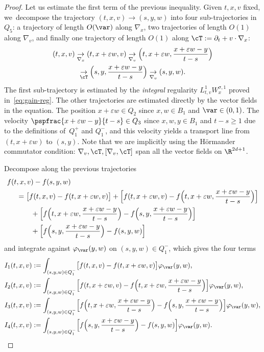 \begin{proof}
Let us estimate the first term of the previous
inequality. Given $t,x,v$ fixed, we~decompose the trajectory
$(t,x,v)\to (s,y,w)$ into four sub-trajectories in
$Q_5$: a trajectory of length $O(\var)$ along $\nabla_x$, two
trajectories of length $O(1)$ along $\nabla_v$, and finally one
trajectory of length $O(1)$ along
$\cT := \partial_t + v \cdot \nabla_x$:
\begin{multline*}
(t,x,v)\underset{\nabla_x}{\to}
(t,x+\varepsilon w,v) \underset{\nabla_v}{\to}
\Bigl(t,x+\varepsilon w, \frac{x+\varepsilon w
-y}{t-s} \Bigr) \\
\underset{\cT}{\to} \Bigl(s,
y,\frac{x+\varepsilon w -y}{t-s} \Bigr)
\underset{\nabla_v}{\to} (s,y,w).
\end{multline*}
The first sub-trajectory is estimated by the {\it integral}
regularity $L^1_{t,v} W^{\sigma,1}_{x}$ proved
in~\eqref{eq:gain-reg}. The other trajectories are estimated
directly by the vector fields in the equation. The position
$x+\varepsilon w \in Q_2$ since $x,w \in B_1$ and
$\var \in (0,1)$. The velocity
$\pspfrac{x+\varepsilon w -y}{t-s} \in Q_3$ since $x,w,y \in B_1$
and $t-s\geq 1$ due to the definitions of~$Q_{1}^+$ and
$Q_{1}^{-}$, and this velocity yields a transport line from
$(t,x+\varepsilon w)$ to $(s,y)$. Note that we are implicitly
using the Hörmander commutator condition:
$\nabla_v,\cT, [\nabla_v,\cT]$ span all the vector fields on
$\R^{2d+1}$.

Decompose along the previous trajectories
\begin{align*}
f(t&,x,v)-f(s,y,w) \\
& = \bigl[ f(t,x,v)-f(t,x+\varepsilon w,v) \bigr] +
\Bigl[ f(t,x+\varepsilon
w,v)- f \Bigl(t,x+\varepsilon w,\frac{x+\varepsilon w -y}{t-s}
\Bigr) \Bigr] \\
& \qquad + \Bigl[ f \Bigl(t,x+\varepsilon w,\frac{x+\varepsilon w
-y}{t-s} \Bigr)- f \Bigl(s,y,\frac{x+\varepsilon w
-y}{t-s} \Bigr) \Bigr] \\
& \qquad + \Bigl[ f \Bigl(s,y,\frac{x+\varepsilon w
-y}{t-s} \Bigr)-f(s,y,w) \Bigr]
\end{align*}
and integrate against $\varphi_\var(y,w)$ on
$(s,y,w)\in Q_{1}^-$, which gives the four terms
\begin{align*}
I_1(t,x,v)
& := \int_{(s,y,w)\in Q_1^{-}}
\bigl[ f(t,x,v)-f(t,x+\varepsilon
w,v)\bigr] \varphi_\var(y,w),\\
I_2(t,x,v)
& := \int_{(s,y,w)\in Q_1^{-}}
\Bigl[ f(t,x+\varepsilon w,v)-f\Bigl(t,x+\varepsilon
w,\frac{x+\varepsilon w -y}{t-s}\Bigr)\Bigr]
\varphi_\var(y,w), \\
I_3(t,x,v)
& := \int_{(s,y,w)\in Q_1^{-}} \Bigl[ f\Bigl(t,x+\varepsilon
w,\frac{x+\varepsilon w
-y}{t-s}\Bigr)-f\Bigl(s,y,\frac{x+\varepsilon w
-y}{t-s}\Bigr)\Bigr] \varphi_\var(y,w), \\
I_4(t,x,v)
& := \int_{(s,y,w)\in Q_1^{-}}
\Bigl[ f\Bigl(s,y,\frac{x+\varepsilon w
-y}{t-s}\Bigr)-f(s,y,w)\Bigr] \varphi_\var(y,w).
\end{align*}


\end{proof}
